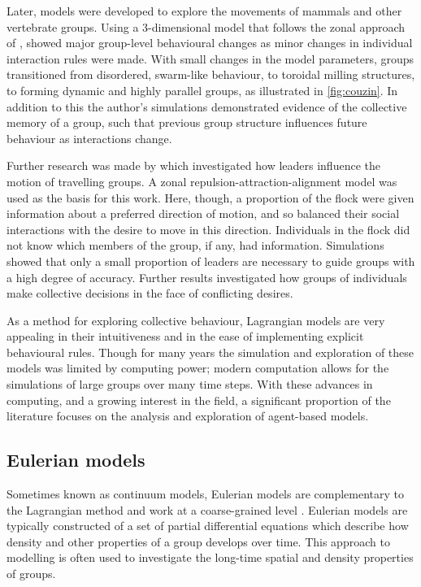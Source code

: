 Later, models were developed to explore the movements of mammals and other vertebrate groups. Using a 
3-dimensional model that follows the zonal approach of \textcite{aoki82}, \textcite{couzin02} showed 
major group-level behavioural changes as minor changes in individual interaction rules were made. 
With small changes in the model parameters, groups transitioned from disordered, swarm-like 
behaviour, to toroidal milling structures, to forming dynamic and highly parallel groups, as 
illustrated in \cref{fig:couzin}. In addition to this the author's simulations demonstrated evidence 
of the collective memory of a group, such that previous group structure influences future behaviour 
as interactions change.

Further research was made by \textcite{couzin05} which investigated how leaders influence the motion 
of travelling groups. A zonal repulsion-attraction-alignment model was used as the basis for this 
work. Here, though, a proportion of the flock were given information about a preferred direction of 
motion, and so balanced their social interactions with the desire to move in this direction. 
Individuals in the flock did not know which members of the group, if any, had information. 
Simulations showed that only a small proportion of leaders are necessary to guide groups with a high 
degree of accuracy. Further results investigated how groups of individuals make collective decisions 
in the face of conflicting desires.

As a method for exploring collective behaviour, Lagrangian models are very appealing in their 
intuitiveness and in the ease of implementing explicit behavioural rules. Though for many years the 
simulation and exploration of these models was limited by computing power; modern computation allows 
for the simulations of large groups over many time steps. With these advances in computing, and a 
growing interest in the field, a significant proportion of the literature focuses on the analysis and 
exploration of agent-based models.

\subsection{Eulerian models}
\label{ssec:eulerian_models}

Sometimes known as continuum models, Eulerian models are complementary to the Lagrangian method and 
work at a coarse-grained level \parencite{giardina08}. Eulerian models are typically constructed of a 
set of partial differential equations which describe how density and other properties of a group 
develops over time. This approach to modelling is often used to investigate the long-time spatial and 
density properties of groups.

